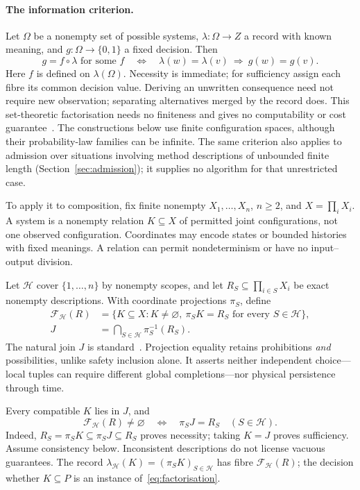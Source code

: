 \documentclass[11pt]{article}
\newcommand{\cF}{\mathcal F}
\newcommand{\cH}{\mathcal H}
\begin{document}
\paragraph{The information criterion.}\label{par:factorisation}
Let $\Omega$ be a nonempty set of possible systems, $\lambda:\Omega\to Z$ a record with known meaning, and $g:\Omega\to\{0,1\}$ a fixed decision. Then
\begin{equation}\label{eq:factorisation}
g=f\circ\lambda\text{ for some }f
\quad\Longleftrightarrow\quad
\lambda(w)=\lambda(v)\ \Longrightarrow\ g(w)=g(v).
\end{equation}
Here $f$ is defined on $\lambda(\Omega)$. Necessity is immediate; for sufficiency assign each fibre its common decision value. Deriving an unwritten consequence need not require new observation; separating alternatives merged by the record does. This set-theoretic factorisation needs no finiteness and gives no computability or cost guarantee~\cite{cost}. The constructions below use finite configuration spaces, although their probability-law families can be infinite. The same criterion also applies to admission over situations involving method descriptions of unbounded finite length (Section~\ref{sec:admission}); it supplies no algorithm for that unrestricted case.

To apply it to composition, fix finite nonempty $X_1,\ldots,X_n$, $n\geq2$, and $X=\prod_iX_i$. A system is a nonempty relation $K\subseteq X$ of permitted joint configurations, not one observed configuration. Coordinates may encode states or bounded histories with fixed meanings. A relation can permit nondeterminism or have no input--output division.

Let $\cH$ cover $\{1,\ldots,n\}$ by nonempty scopes, and let $R_S\subseteq\prod_{i\in S}X_i$ be exact nonempty descriptions. With coordinate projections $\pi_S$, define
\begin{align}
\cF_{\cH}(R)&=\{K\subseteq X:K\ne\varnothing,\ \pi_SK=R_S\text{ for every }S\in\cH\},\label{eq:family}\\
J&=\bigcap_{S\in\cH}\pi_S^{-1}(R_S).\label{eq:join}
\end{align}
The natural join $J$ is standard~\cite{beeri,fagin}. Projection equality retains prohibitions \emph{and} possibilities, unlike safety inclusion alone. It asserts neither independent choice---local tuples can require different global completions---nor physical persistence through time.

Every compatible $K$ lies in $J$, and
\begin{equation}\label{eq:consistency}
\cF_{\cH}(R)\ne\varnothing\quad\Longleftrightarrow\quad
\pi_SJ=R_S\quad(S\in\cH).
\end{equation}
Indeed, $R_S=\pi_SK\subseteq\pi_SJ\subseteq R_S$ proves necessity; taking $K=J$ proves sufficiency. Assume consistency below. Inconsistent descriptions do not license vacuous guarantees. The record $\lambda_{\cH}(K)=(\pi_SK)_{S\in\cH}$ has fibre $\cF_{\cH}(R)$; the decision whether $K\subseteq P$ is an instance of~\eqref{eq:factorisation}.
\end{document}
